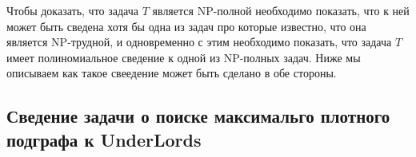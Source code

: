 \documentclass{article}
\begin{document}
Чтобы доказать, что задача $T$ является NP-полной необходимо показать, что  к ней может быть сведена хотя бы одна из задач про которые известно, что она является NP-трудной, и одновременно с этим необходимо показать, что задача $T$ имеет полиномиальное сведение к одной из NP-полных задач. Ниже мы описываем как такое свеедение может быть сделано в обе стороны.



\subsection{Сведение задачи о поиске максимальго плотного подграфа к UnderLords}
\end{document}
